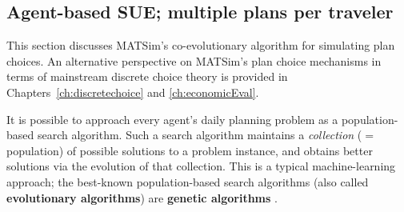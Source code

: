 \subsection{Agent-based SUE; multiple plans per traveler}
\label{sec:agent-based-sue}

This section discusses MATSim's co-evolutionary algorithm for simulating
plan choices. An alternative perspective on MATSim's plan choice mechanisms
in terms of mainstream discrete choice theory \citep{ben-akiva-1985} is
provided in Chapters~\ref{ch:discretechoice} and \ref{ch:economicEval}.

% 

It is possible to approach every agent's daily
planning problem as a population-based search algorithm.  Such a
search algorithm maintains a \emph{collection} ($=$ population) of
possible solutions to a problem instance, and obtains better solutions
via the evolution of that collection.  This is a typical
machine-learning \citep[e.g.][]{RussellNorvigBook} approach; the best-known
population-based search algorithms (also called \textbf{evolutionary
algorithms}) are \textbf{genetic algorithms} \citep[e.g.,][]{GoldbergBook}.

